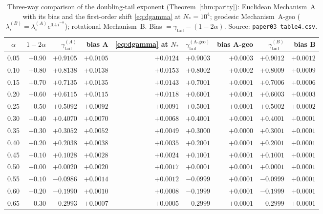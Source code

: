 \documentclass[11pt,reqno]{amsart}
\theoremstyle{plain}
\theoremstyle{definition}
\theoremstyle{remark}
\numberwithin{equation}{section}
\newcommand{\gtail}{\gamma_{\mathrm{tail}}}
\begin{document}
\begin{table}[p]
\centering\footnotesize\setlength{\tabcolsep}{4pt}
\caption{Three-way comparison of the doubling-tail exponent (Theorem~\ref{thm:parity}): Euclidean Mechanism~A with its bias and the first-order shift \eqref{eq:dgamma} at $N_*=10^4$; geodesic Mechanism~A-geo ($\lambda^{(B)}_i=\lambda^{(A)}_ie^{0.4\,i^{-\alpha}}$); rotational Mechanism~B. Bias $=\gtail-(1-2\alpha)$. Source: \texttt{paper03\_table4.csv}.}
\label{tab:threeway}
\begin{tabular}{@{}crrrrrrrr@{}}
\toprule
$\alpha$ & $1-2\alpha$ & $\gtail^{(A)}$ & bias A & \eqref{eq:dgamma} at $N_*$ & $\gtail^{(\mathrm{A\text{-}geo})}$ & bias A-geo & $\gtail^{(B)}$ & bias B \\
\midrule
0.05 & $+0.90$ & $+0.9105$ & $+0.0105$ & $+0.0124$ & $+0.9003$ & $+0.0003$ & $+0.9012$ & $+0.0012$ \\
0.10 & $+0.80$ & $+0.8138$ & $+0.0138$ & $+0.0153$ & $+0.8002$ & $+0.0002$ & $+0.8009$ & $+0.0009$ \\
0.15 & $+0.70$ & $+0.7135$ & $+0.0135$ & $+0.0143$ & $+0.7001$ & $+0.0001$ & $+0.7006$ & $+0.0006$ \\
0.20 & $+0.60$ & $+0.6115$ & $+0.0115$ & $+0.0118$ & $+0.6001$ & $+0.0001$ & $+0.6003$ & $+0.0003$ \\
0.25 & $+0.50$ & $+0.5092$ & $+0.0092$ & $+0.0091$ & $+0.5001$ & $+0.0001$ & $+0.5002$ & $+0.0002$ \\
0.30 & $+0.40$ & $+0.4070$ & $+0.0070$ & $+0.0068$ & $+0.4001$ & $+0.0001$ & $+0.4001$ & $+0.0001$ \\
0.35 & $+0.30$ & $+0.3052$ & $+0.0052$ & $+0.0049$ & $+0.3000$ & $+0.0000$ & $+0.3001$ & $+0.0001$ \\
0.40 & $+0.20$ & $+0.2038$ & $+0.0038$ & $+0.0035$ & $+0.2001$ & $+0.0001$ & $+0.2001$ & $+0.0001$ \\
0.45 & $+0.10$ & $+0.1028$ & $+0.0028$ & $+0.0024$ & $+0.1001$ & $+0.0001$ & $+0.1001$ & $+0.0001$ \\
0.50 & $+0.00$ & $+0.0020$ & $+0.0020$ & $+0.0017$ & $+0.0001$ & $+0.0001$ & $+0.0001$ & $+0.0001$ \\
0.55 & $-0.10$ & $-0.0986$ & $+0.0014$ & $+0.0012$ & $-0.0999$ & $+0.0001$ & $-0.0999$ & $+0.0001$ \\
0.60 & $-0.20$ & $-0.1990$ & $+0.0010$ & $+0.0008$ & $-0.1999$ & $+0.0001$ & $-0.1999$ & $+0.0001$ \\
0.65 & $-0.30$ & $-0.2993$ & $+0.0007$ & $+0.0005$ & $-0.2999$ & $+0.0001$ & $-0.2999$ & $+0.0001$ \\

\end{tabular}
\end{table}
\end{document}
